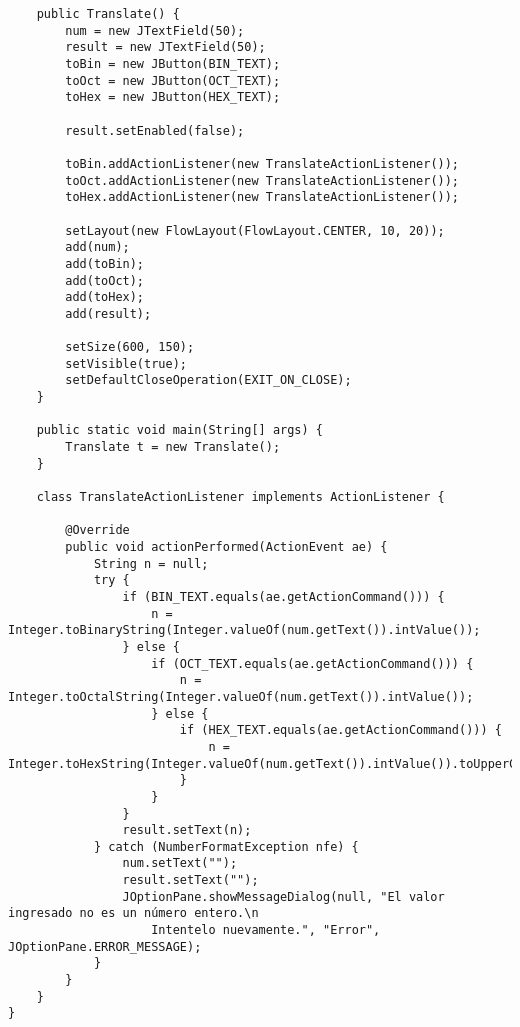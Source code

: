 \documentclass[10pt]{article}
\begin{document}
{\begin{enumerate}
\begin{verbatim}
    public Translate() {
        num = new JTextField(50);
        result = new JTextField(50);
        toBin = new JButton(BIN_TEXT);
        toOct = new JButton(OCT_TEXT);
        toHex = new JButton(HEX_TEXT);

        result.setEnabled(false);

        toBin.addActionListener(new TranslateActionListener());
        toOct.addActionListener(new TranslateActionListener());
        toHex.addActionListener(new TranslateActionListener());

        setLayout(new FlowLayout(FlowLayout.CENTER, 10, 20));
        add(num);
        add(toBin);
        add(toOct);
        add(toHex);
        add(result);

        setSize(600, 150);
        setVisible(true);
        setDefaultCloseOperation(EXIT_ON_CLOSE);
    }

    public static void main(String[] args) {
        Translate t = new Translate();
    }

    class TranslateActionListener implements ActionListener {

        @Override
        public void actionPerformed(ActionEvent ae) {
            String n = null;
            try {
                if (BIN_TEXT.equals(ae.getActionCommand())) {
                    n = Integer.toBinaryString(Integer.valueOf(num.getText()).intValue());
                } else {
                    if (OCT_TEXT.equals(ae.getActionCommand())) {
                        n = Integer.toOctalString(Integer.valueOf(num.getText()).intValue());
                    } else {
                        if (HEX_TEXT.equals(ae.getActionCommand())) {
                            n = Integer.toHexString(Integer.valueOf(num.getText()).intValue()).toUpperCase();
                        }
                    }
                }
                result.setText(n);
            } catch (NumberFormatException nfe) {
                num.setText("");
                result.setText("");
                JOptionPane.showMessageDialog(null, "El valor ingresado no es un número entero.\n 
                    Intentelo nuevamente.", "Error", JOptionPane.ERROR_MESSAGE);
            }
        }
    }
}
\end{verbatim}

	\end{enumerate}}
\end{document}
